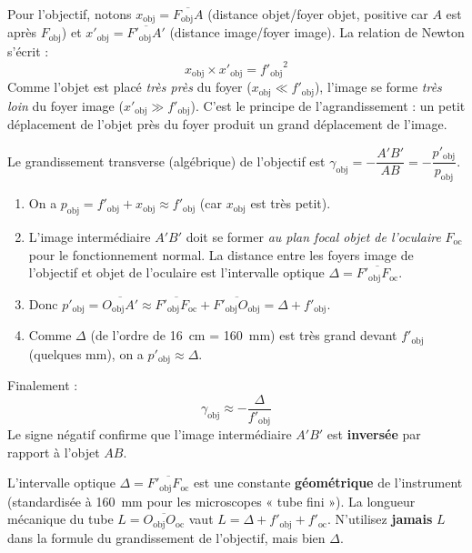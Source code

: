 \documentclass[11pt]{article}
\newcommand{\cle}[1]{{\popxbold\color{popdark}#1}}
\begin{document}
\begin{propriete}
Pour l'objectif, notons $x_{\text{obj}} = \overline{F_{\text{obj}}A}$ (distance objet/foyer objet, positive car $A$ est après $F_{\text{obj}}$) et $x'_{\text{obj}} = \overline{F'_{\text{obj}}A'}$ (distance image/foyer image).
La relation de Newton s'écrit :
\[
x_{\text{obj}} \times x'_{\text{obj}} = {f'_{\text{obj}}}^2
\]
Comme l'objet est placé \emph{très près} du foyer ($x_{\text{obj}} \ll f'_{\text{obj}}$), l'image se forme \emph{très loin} du foyer image ($x'_{\text{obj}} \gg f'_{\text{obj}}$). C'est le principe de l'agrandissement : un petit déplacement de l'objet près du foyer produit un grand déplacement de l'image.
\end{propriete}

\begin{propriete}
Le grandissement transverse (algébrique) de l'objectif est $\gamma_{\text{obj}} = -\dfrac{A'B'}{AB} = -\dfrac{p'_{\text{obj}}}{p_{\text{obj}}}$.
\begin{enumerate}
    \item On a $p_{\text{obj}} = f'_{\text{obj}} + x_{\text{obj}} \approx f'_{\text{obj}}$ (car $x_{\text{obj}}$ est très petit).
    \item L'image intermédiaire $A'B'$ doit se former \emph{au plan focal objet de l'oculaire} $F_{\text{oc}}$ pour le fonctionnement normal. La distance entre les foyers image de l'objectif et objet de l'oculaire est l'\cle{intervalle optique} $\Delta = \overline{F'_{\text{obj}}F_{\text{oc}}}$.
    \item Donc $p'_{\text{obj}} = \overline{O_{\text{obj}}A'} \approx \overline{F'_{\text{obj}}F_{\text{oc}}} + \overline{F'_{\text{obj}}O_{\text{obj}}} = \Delta + f'_{\text{obj}}$.
    \item Comme $\Delta$ (de l'ordre de \SI{16}{cm} = \SI{160}{mm}) est très grand devant $f'_{\text{obj}}$ (quelques mm), on a $p'_{\text{obj}} \approx \Delta$.
\end{enumerate}
Finalement :
\[
\boxed{\gamma_{\text{obj}} \approx -\frac{\Delta}{f'_{\text{obj}}}}
\]
Le signe négatif confirme que l'image intermédiaire $A'B'$ est \textbf{inversée} par rapport à l'objet $AB$.
\end{propriete}

\begin{attention}
L'intervalle optique $\Delta = \overline{F'_{\text{obj}}F_{\text{oc}}}$ est une constante \textbf{géométrique} de l'instrument (standardisée à \SI{160}{mm} pour les microscopes « tube fini »).
La longueur mécanique du tube $L = \overline{O_{\text{obj}}O_{\text{oc}}}$ vaut $L = \Delta + f'_{\text{obj}} + f'_{\text{oc}}$.
N'utilisez \textbf{jamais} $L$ dans la formule du grandissement de l'objectif, mais bien $\Delta$.
\end{attention}
\end{document}
